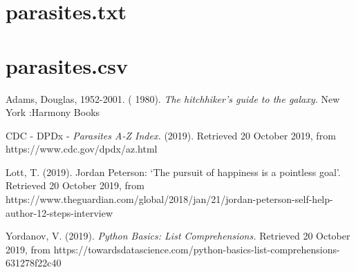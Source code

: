 \documentclass[journal,onecolumn]{IEEEtran}
\begin{document}
\newpage

\section{parasites.txt}
\label{app1}
\lstset{basicstyle=\tiny}


\newpage

\section{parasites.csv}
\label{app1}
\lstset{basicstyle=\ttfamily \tiny}


\newpage

\begin{thebibliography}{1}



Adams, Douglas, 1952-2001. ( 1980). \emph{The hitchhiker's guide to the galaxy.} New York :Harmony Books

CDC - DPDx - \emph{Parasites A-Z Index.} (2019). Retrieved 20 October 2019, from https://www.cdc.gov/dpdx/az.html

Lott, T. (2019). Jordan Peterson: ‘The pursuit of happiness is a pointless goal’. Retrieved 20 October 2019, from https://www.theguardian.com/global/2018/jan/21/jordan-peterson-self-help-author-12-steps-interview

Yordanov, V. (2019). \emph{Python Basics: List Comprehensions.} Retrieved 20 October 2019, from https://towardsdatascience.com/python-basics-list-comprehensions-631278f22c40

\end{thebibliography}

\end{document}

